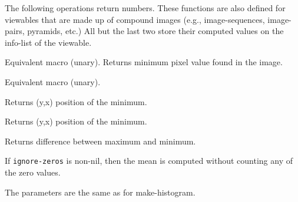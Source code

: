 
The following operations return numbers.  These functions are also
defined for viewables that are made up of compound images (e.g.,
image-sequences, image-pairs, pyramids, etc.)  All but the last two
store their computed values on the info-list of the viewable.

\begin{description}
\item{}
Equivalent macro  (unary).  Returns minimum pixel value found in
the image.

\item{}
Equivalent macro  (unary).

\item{}
Returns (y,x) position of the minimum.

\item{}
Returns (y,x) position of the minimum.

\item{}
Returns difference between maximum and minimum.

\item{}
If {\tt ignore-zeros} is non-nil, then the mean is computed without
counting any of the zero values.

\item{}
\item{}
\item{}

\item{}
The parameters are the same as for make-histogram.

\end{description}



